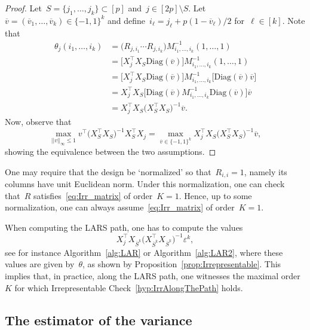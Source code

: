 \documentclass[final,numbib]{imaiai}%
\numberwithin{equation}{section}
\renewcommand{\bar}{\overline}
\def\\bUnif{\text{\bUnif}}
\newcommand{\<}{\langle}
\renewcommand{\>}{\rangle}
\newcommand{\1}{\mathds{1}}
\begin{document}
{\begin{proof}
Let~$S=\{j_1,\ldots,j_k\}\subset[p]$ and~$j\in[2p]\setminus S$.
Let~$\bar v=(\bar v_1,\ldots,\bar v_k)\in\{-1,1\}^k$ and define~$i_\ell = j_\ell+p(1-\bar v_\ell)/2$ for~$\ell\in[k]$.
Note that
\begin{align*}
\theta_j(i_1,\ldots, i_k) &= \big(R_{j,i_1} \cdots R_{j,i_{k}}  \big)M^{-1}_{i_1,\ldots, i_{k}}  
(1, \ldots, 1)\\
&= \Big[X_j^\top X_S\mathrm{Diag}(\bar v)\Big]M^{-1}_{i_1,\ldots, i_{k}}(1, \ldots, 1)\\
&=\Big[  X_j^\top X_S\mathrm{Diag}(\bar v)\Big]M^{-1}_{i_1,\ldots, i_{k}}\Big[\mathrm{Diag}(\bar v)\bar v\Big]\\
&= X_j^\top X_S\Big[\mathrm{Diag}(\bar v)M^{-1}_{i_1,\ldots, i_{k}}\mathrm{Diag}(\bar v)\Big]\bar v\\
&= X_j^\top X_S\big( X_S^\top  X_S\big)^{-1}\bar v.
\end{align*}
Now, observe that 
\[
\max_{||v||_\infty\leq1}v^\top\big( X_S^\top  X_S\big)^{-1} X_S^\top X_j
=\max_{\bar v\in\{-1,1\}^k} X_j^\top X_S\big( X_S^\top  X_S\big)^{-1}\bar v,
\]
showing the equivalence between the two assumptions.
\end{proof}


\begin{remark}
One may require that the design be `normalized' so that~$R_{i,i}=1$, namely its columns have unit Euclidean norm.
Under this normalization, one can check that~$R$ satisfies~\eqref{eq:Irr_matrix} of order~$K=1$.
Hence, up to some normalization, one can always assume~\eqref{eq:Irr_matrix} of order~$K=1$.
\end{remark}

\begin{remark}
When computing the LARS path, one has to compute the values 
\[
X_j^\top X_{\bar S^{k}}\big( X_{\bar S^{k}}^\top  X_{\bar S^{k}}\big)^{-1}\varepsilon^{k},
\] 
see for instance Algorithm~\ref{alg:LAR} or Algorithm~\ref{alg:LAR2}, where these values are given by~$\theta$, as shown by Proposition~\ref{prop:Irrepresentable}.
This implies that, in practice, along the LARS path, one witnesses the maximal order~$K$ for which Irrepresentable Check~\eqref{hyp:IrrAlongThePath} holds.
\end{remark}

\subsection{The estimator of the variance}
\label{sec:var_estimation}

}
\end{document}
